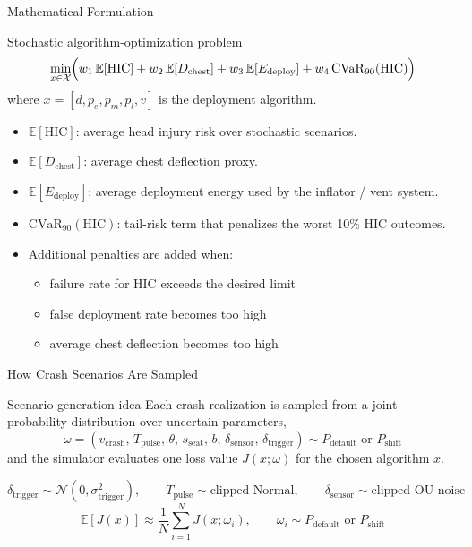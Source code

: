 \documentclass[aspectratio=169]{beamer}
\begin{document}
\begin{frame}{Mathematical Formulation}
  \begin{block}{Stochastic algorithm-optimization problem}
    \[
    \min_{x \in \mathcal{X}}
    \Bigl(
    w_1 \, \mathbb{E}[\mathrm{HIC}]
    + w_2 \, \mathbb{E}[D_{\text{chest}}]
    + w_3 \, \mathbb{E}[E_{\text{deploy}}]
    + w_4 \, \mathrm{CVaR}_{90}(\mathrm{HIC})
    \Bigr)
    \]
    where $x = [d, p_e, p_m, p_l, v]$ is the deployment algorithm.
  \end{block}

  \begin{itemize}
    \item $\mathbb{E}[\mathrm{HIC}]$: average head injury risk over stochastic scenarios.
    \item $\mathbb{E}[D_{\text{chest}}]$: average chest deflection proxy.
    \item $\mathbb{E}[E_{\text{deploy}}]$: average deployment energy used by the inflator / vent system.
    \item $\mathrm{CVaR}_{90}(\mathrm{HIC})$: tail-risk term that penalizes the worst 10\% HIC outcomes.
    \item Additional penalties are added when:
    \begin{itemize}
      \item failure rate for HIC exceeds the desired limit
      \item false deployment rate becomes too high
      \item average chest deflection becomes too high
    \end{itemize}
  \end{itemize}
\end{frame}

\begin{frame}{How Crash Scenarios Are Sampled}
  \scriptsize
  \begin{block}{Scenario generation idea}
    Each crash realization is sampled from a joint probability distribution over uncertain parameters,
    \[
    \omega = (v_{\mathrm{crash}},\, T_{\mathrm{pulse}},\, \theta,\, s_{\mathrm{seat}},\, b,\, \delta_{\mathrm{sensor}},\, \delta_{\mathrm{trigger}})
    \sim P_{\mathrm{default}} \text{ or } P_{\mathrm{shift}}
    \]
    and the simulator evaluates one loss value \(J(x;\omega)\) for the chosen algorithm \(x\).
  \end{block}

  \vspace{0.3em}
  \[
  \delta_{\mathrm{trigger}} \sim \mathcal{N}(0,\sigma_{\mathrm{trigger}}^2),
  \qquad
  T_{\mathrm{pulse}} \sim \text{clipped Normal},
  \qquad
  \delta_{\mathrm{sensor}} \sim \text{clipped OU noise}
  \]
  \[
  \mathbb{E}[J(x)] \approx \frac{1}{N}\sum_{i=1}^{N} J(x;\omega_i), \qquad \omega_i \sim P_{\mathrm{default}} \text{ or } P_{\mathrm{shift}}
  \]
\end{frame}
\end{document}

